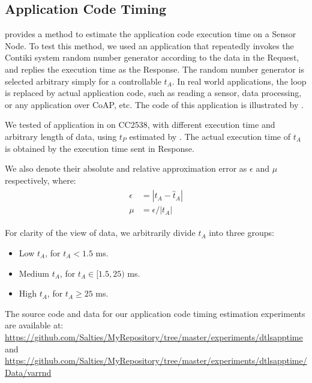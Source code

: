 \subsection{Application Code Timing} \label{App code timing}

 provides a method to estimate the application code execution time on a Sensor  Node. To test this method, we used an application that repeatedly invokes the Contiki system random number generator according to the data in the Request, and replies the execution time as the Response. The random number generator is selected arbitrary simply for a controllable $t_A$. In real world applications, the loop is replaced by actual application code, such as reading a sensor, data processing, or any application over CoAP, etc. The code of this application is illustrated by .

 

We tested  of application in  on CC2538, with different execution time and arbitrary length of data, using $t_P$ estimated by . The actual execution time of $t_A$ is obtained by the execution time sent in Response.

We also denote their absolute and relative approximation error as $\epsilon$ and $\mu$ respectively, where:
\begin{eqnarray}
	\begin{aligned}
		\epsilon	&= |t_A - \hat{t}_A| \\
		\mu 	&= \epsilon / |t_A|
	\end{aligned}
\end{eqnarray}

For clarity of the view of data, we arbitrarily divide $t_A$ into three groups:
\begin{itemize}
	\item Low $t_A$, for $t_A < 1.5$ ms.
	\item Medium $t_A$, for $t_A \in [1.5, 25)$ ms.
	\item High $t_A$, for $t_A \geq 25$ ms.
\end{itemize}

The source code and data for our application code timing estimation experiments are available at: \\
\url{https://github.com/Salties/MyRepository/tree/master/experiments/dtlsapptime} \\
and \\
\url{https://github.com/Salties/MyRepository/tree/master/experiments/dtlsapptime/Data/varrnd}

